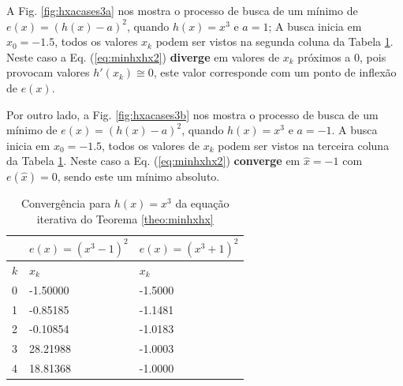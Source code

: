 \begin{example}\label{ex:minhxhx3}
 A Fig. \ref{fig:hxacases3a} nos mostra o processo de busca de um mínimo
 de $e(x)=(h(x)-a)^2$, quando $h(x)=x^3$ e $a=1$; A busca inicia em $x_0=-1.5$,
 todos os valores $x_{k}$ podem ser vistos na segunda coluna da
Tabela \ref{tab:hxacases3}. Neste caso a Eq. (\ref{eq:minhxhx2}) \textbf{diverge} em 
valores de $x_{k}$ próximos a $0$, pois provocam valores  $h'(x_{k})\cong 0$,
este valor corresponde com um ponto de inflexão de $e(x)$.

 Por outro lado, a Fig. \ref{fig:hxacases3b} nos mostra o processo de busca de um mínimo
 de $e(x)=(h(x)-a)^2$, quando $h(x)=x^3$ e $a=-1$. A busca inicia em $x_0=-1.5$,
 todos os valores de $x_{k}$ podem ser vistos na terceira coluna da
Tabela \ref{tab:hxacases3}. Neste caso a Eq. (\ref{eq:minhxhx2}) \textbf{converge} 
em $\hat{x}=-1$ com $e(\hat{x})=0$, sendo este um mínimo absoluto.

\end{example}

\begin{table}[!h]
\centering
\begin{tabular}{|l|l|l|}
\hline
~&$e(x)=(x^3-1)^2$ & $e(x)=(x^3+1)^2$ \\ \hline
$k$&$x_k$  & $x_k$ \\ \hline
0&-1.50000  & -1.5000   \\
1&-0.85185  & -1.1481   \\
2&-0.10854  & -1.0183   \\
3&28.21988  & -1.0003   \\
4&18.81368  & -1.0000   \\  \hline
\end{tabular}
\caption{Convergência para $h(x)=x^3$ da equação iterativa do Teorema \ref{theo:minhxhx}}
\label{tab:hxacases3}
\end{table}

